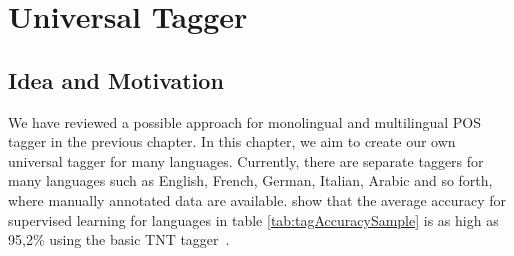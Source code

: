 \chapter{Universal Tagger}
\label{chap:uniTagger}

\section{Idea and Motivation} 
We have reviewed a possible approach for monolingual and multilingual POS tagger in the previous chapter. In this chapter, we aim to create our own universal tagger for many languages. Currently, there are separate taggers for many languages such as English, French, German, Italian, Arabic and so forth, where manually annotated data are available.  show that the average accuracy for supervised learning for languages in table \ref{tab:tagAccuracySample} is as high as 95,2\% using the basic TNT tagger~\cite{TNTTagger}.  

